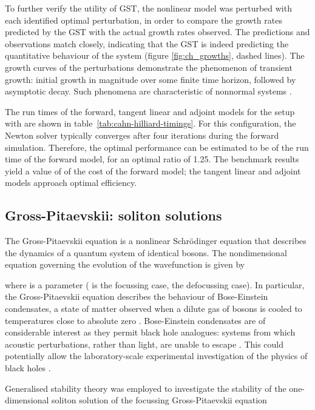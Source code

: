 \documentclass{siamltex}
\begin{document}
To further verify the utility of GST, the nonlinear model was perturbed with each identified optimal perturbation, in order to compare the growth rates
predicted by the GST with the actual growth rates observed. The predictions and observations match closely, indicating that the
GST is indeed predicting the quantitative behaviour of the system (figure \ref{fig:ch_growths}, dashed lines). The growth curves of the
perturbations demonstrate the phenomenon of transient growth: initial growth in magnitude over some finite time horizon, followed by
asymptotic decay. Such phenomena are characteristic of nonnormal systems \cite{trefethen2006}.

The run times of the forward, tangent linear and adjoint models for the setup with  are shown in table~\ref{tab:cahn-hilliard-timings}. 
For this configuration, the Newton solver typically converges after four iterations during the forward simulation. 
Therefore, the optimal performance can be estimated to be  of the run time of the forward model, for an optimal ratio of 1.25.
The benchmark results yield a value of  of the cost of the forward model; the tangent linear and adjoint models approach optimal efficiency.

\subsection{Gross-Pitaevskii: soliton solutions}

The Gross-Pitaevskii equation \cite{gross1961,pitaevskii1961} is a nonlinear Schr\"odinger equation that describes the dynamics
of a quantum system of identical bosons. The nondimensional equation governing the evolution of the wavefunction  is given by

where  is a parameter ( is the focussing case,  the defocussing case). In particular, the Gross-Pitaevskii equation
describes the behaviour of Bose-Einstein condensates, a state of matter observed when a dilute gas of bosons is cooled to temperatures
close to absolute zero \cite{bose1924,einstein1924}. Bose-Einstein condensates are of considerable interest as they permit
black hole analogues: systems from which acoustic perturbations, rather than light, are unable to escape \cite{unruh1981}. This
could potentially allow the laboratory-scale experimental investigation of the physics of black holes \cite{farrell2008,lahav2010}.

Generalised stability theory was employed to investigate the stability of the one-dimensional soliton solution of the focussing Gross-Pitaevskii
equation
\end{document}
